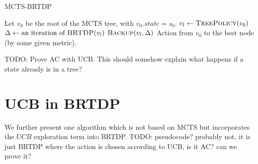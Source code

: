 \begin{algorithm}
\caption{MCTS-BRTDP}
\label{mcts-brtdp}
\begin{algorithmic}
    \State Let $v_0$ be the root of the MCTS tree, with $v_0.state = s_0$.
        \State $v_l \gets \Call{TreePolicy}{v_0}$
        \State $\Delta \gets \text{an iteration of } \Call{BRTDP}{v_l}$
        \State $\Call{Backup}{v_l, \Delta}$
    \EndWhile
    \State \Return Action from $v_0$ to the best node (by some
    given metric).
\EndFunction

\end{algorithmic}
\end{algorithm}

TODO: Prove AC with UCB. This should somehow explain
what happens if a state already is in a tree?


\section{UCB in BRTDP}

We further present one algorithm which is not based on MCTS but
incorporates the $UCB$ exploration term into BRTDP. TODO: pseudocode?
probably not, it is just BRTDP where the action is chosen according to
UCB, is it AC? can we prove it?
